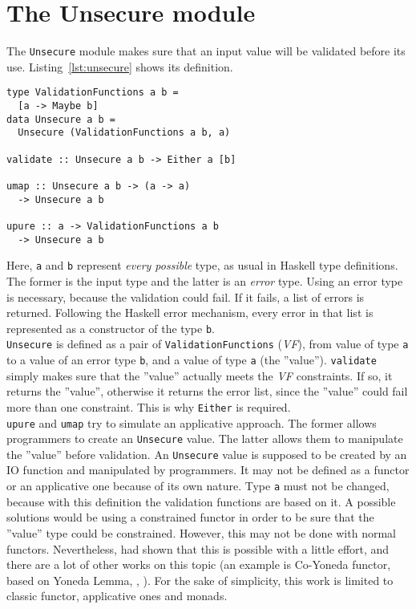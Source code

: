 \section{The Unsecure module}\label{sec:usecure}
The \texttt{Unsecure} module makes sure that an input value will be validated before its use. Listing~\ref{lst:unsecure} shows its definition.

\begin{lstlisting}[caption={Unsecure module}, label={lst:unsecure}, frame=single]
type ValidationFunctions a b =
  [a -> Maybe b]
data Unsecure a b =  
  Unsecure (ValidationFunctions a b, a)
 
validate :: Unsecure a b -> Either a [b]

umap :: Unsecure a b -> (a -> a) 
  -> Unsecure a b

upure :: a -> ValidationFunctions a b
  -> Unsecure a b
\end{lstlisting}
Here, \texttt{a} and \texttt{b} represent \textit{every possible} type, as usual in Haskell type definitions. The former is the input type and the latter is an \textit{error} type. Using an error type is necessary, because the validation could fail. If it fails, a list of errors is returned. Following the Haskell error mechanism, every error in that list is represented as a constructor of the type \texttt{b}. \\
\texttt{Unsecure} is defined as a pair of \texttt{ValidationFunctions} (\textit{VF}), from value of type \texttt{a} to a value of an error type \texttt{b}, and a value of type \texttt{a} (the ''value''). \texttt{validate} simply makes sure that the ''value'' actually meets the \textit{VF} constraints. If so, it returns the ''value'', otherwise it returns the error list, since the ''value'' could fail more than one constraint. This is why \texttt{Either} is required. \\
\texttt{upure} and \texttt{umap} try to simulate an applicative approach. The former allows programmers to create an \texttt{Unsecure} value. The latter allows them to manipulate the ''value'' before validation. An \texttt{Unsecure} value is supposed to be created by an IO function and manipulated by programmers. It may not be defined as a functor or an applicative one because of its own nature. Type \texttt{a} must not be changed, because with this definition the validation functions are based on it. A possible solutions would be using a constrained functor in order to be sure that the ''value'' type could be constrained. However, this may not be done with normal functors. Nevertheless, \citeauthor{Sculthorpe:13:ConstrainedMonad} \cite{Sculthorpe:13:ConstrainedMonad} had shown that this is possible with a little effort, and there are a lot of other works on this topic (an example is Co-Yoneda functor, based on Yoneda Lemma, \cite{elkins2009calculating}, \cite{yoneda}). For the sake of simplicity, this work is limited to classic functor, applicative ones and monads. \\
